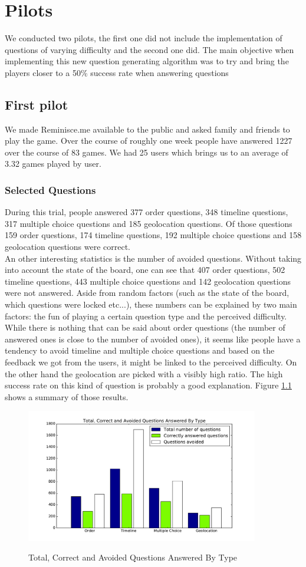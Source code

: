 \chapter{Pilots}
We conducted two pilots, the first one did not include the implementation of questions of varying difficulty and the second one did. The main objective when implementing this new question generating algorithm was to try and bring the players closer to a 50\% success rate when answering questions
\section{First pilot}\label{sec:pilot1}
We made Reminisce.me available to the public and asked family and friends to play the game. Over the course of roughly one week people have answered 1227 over the course of 83 games. We had 25 users which brings us to an average of 3.32 games played by user.
\subsection{Selected Questions}
During this trial, people answered 377 order questions, 348 timeline questions, 317 multiple choice questions and 185 geolocation questions. Of those questions 159 order questions, 174 timeline questions, 192 multiple choice questions and 158 geolocation questions were correct.\\
An other interesting statistics is the number of avoided questions. Without taking into account the state of the board, one can see that 407 order questions, 502 timeline questions, 443 multiple choice questions and 142 geolocation questions were not answered. Aside from random factors (such as the state of the board, which questions were locked etc...), these numbers can be explained by two main factors: the fun of playing a certain question type and the perceived difficulty. While there is nothing that can be said about order questions (the number of answered ones is close to the number of avoided ones), it seems like people have a tendency to avoid timeline and multiple choice questions and based on the feedback we got from the users, it might be linked to the perceived difficulty. On the other hand the geolocation are picked with a visibly high ratio. The high success rate on this kind of question is probably a good explanation. Figure \ref{fig:p1TotCorrectAvoid} shows a summary of those results.
\begin{figure}
\centering
{\includegraphics[width=4in]{images/pilot_1_selected_questions.pdf}}
\caption{Total, Correct and Avoided Questions Answered By Type}
\label{fig:p1TotCorrectAvoid}
\end{figure}
